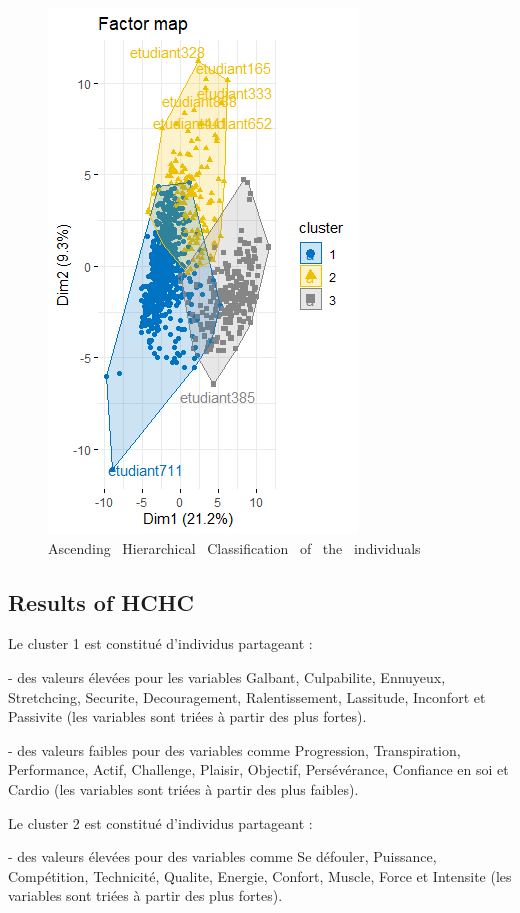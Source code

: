 \documentclass[12pt]{article}
\begin{document}
\begin{figure}[H]
\begin{center}
\includegraphics[scale=0.8]{hcpc.png} 
\caption[]{Ascending \ Hierarchical \ Classification \ of \ the \ individuals }
\end{center}
\end{figure}


\subsection{Results of HCHC} 

Le cluster 1 est constitué d'individus partageant :

- des valeurs élevées pour les variables Galbant, Culpabilite, Ennuyeux, 
Stretchcing, Securite, Decouragement, Ralentissement, Lassitude,
Inconfort et Passivite (les variables sont triées à partir des plus fortes).

- des valeurs faibles pour des variables comme Progression, Transpiration, Performance,
Actif, Challenge, Plaisir, Objectif, Persévérance, Confiance en soi et Cardio 
(les variables sont triées à partir des plus faibles).


Le cluster 2 est constitué d'individus partageant :


- des valeurs élevées pour des variables comme Se défouler, Puissance, Compétition, Technicité, Qualite, Energie, Confort, Muscle, Force et Intensite (les variables sont triées à partir des plus fortes).
\end{document}
